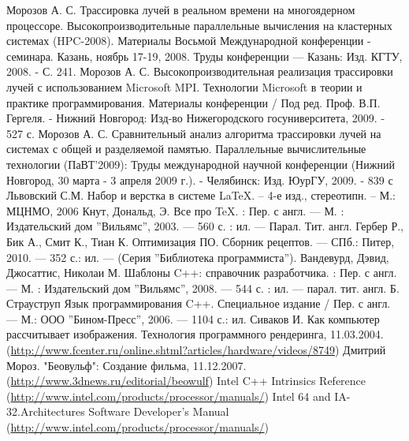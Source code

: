\documentclass[12pt, a4paper, utf8]{article}
\begin{document}
\newpage
\begin{thebibliography}{99}
	 Морозов А. С. Трассировка лучей в реальном времени на многоядерном процессоре. Высокопроизводительные параллельные вычисления на кластерных системах (HPC-2008). Материалы Восьмой Международной конференции -  семинара. Казань, ноябрь 17-19, 2008. Труды конференции — Казань: Изд. КГТУ, 2008. - С. 241.
	 Морозов А. С. Высокопроизводительная реализация трассировки лучей с использованием Microsoft MPI. Технологии Microsoft в теории и практике программирования. Материалы конференции / Под ред. Проф. В.П. Гергеля. - Нижний Новгород: Изд-во Нижегородского госуниверситета, 2009. - 527 с.
	 Морозов А. С. Сравнительный анализ алгоритма трассировки лучей на системах с общей и разделяемой памятью. Параллельные вычислительные технологии (ПаВТ’2009): Труды международной научной конференции (Нижний Новгород, 30 марта - 3 апреля 2009 г.). - Челябинск: Изд. ЮурГУ, 2009. - 839 с
	 Львовский С.М. Набор и верстка в системе \LaTeX. – 4-е изд., стереотипн. – М.: МЦНМО, 2006
	 Кнут, Дональд, Э. Все про \TeX. : Пер. с англ. --- М. : Издательский дом ''Вильямс'', 2003. --- 560 с. : ил. --- Парал. Тит. англ.
	 Гербер Р., Бик А., Смит К., Тиан К. Оптимизация ПО. Сборник рецептов. --- СПб.: Питер, 2010. --- 352 с.: ил. --- (Серия ''Библиотека программиста'').
	 Вандевурд, Дэвид, Джосаттис, Николаи М. Шаблоны C++: справочник разработчика. : Пер. с англ. --- М. : Издательский дом ''Вильямс'', 2008. --- 544 с. : ил. --- парал. тит. англ.
	 Б. Страуструп Язык программирования C++. Специальное издание / Пер. с англ. --- М.: ООО ''Бином-Пресс'', 2006. --- 1104 с.: ил.
	 Сиваков И. Как компьютер рассчитывает изображения. Технология программного рендеринга, 11.03.2004. \\ (\href{http://www.fcenter.ru/online.shtml?articles/hardware/videos/8749}{http://www.fcenter.ru/online.shtml?articles/hardware/videos/8749})
	 Дмитрий Мороз. "Беовульф": Создание фильма, 11.12.2007.\\ (\href{http://www.3dnews.ru/editorial/beowulf}{http://www.3dnews.ru/editorial/beowulf})
	 Intel C++ Intrinsics Reference \\ (\href{http://www.intel.com/products/processor/manuals/}{http://www.intel.com/products/processor/manuals/})
	 Intel 64 and IA-32.Architectures Software Developer's Manual \\ (\href{http://www.intel.com/products/processor/manuals/}{http://www.intel.com/products/processor/manuals/})

\end{thebibliography}
\end{document}

